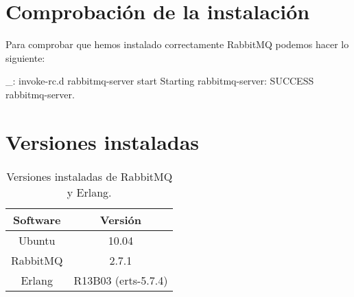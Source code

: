 \section{Comprobación de la instalación}

Para comprobar que hemos instalado correctamente RabbitMQ podemos hacer lo siguiente:

\begin{bashcode}
_: invoke-rc.d rabbitmq-server start
Starting rabbitmq-server: SUCCESS
rabbitmq-server.
\end{bashcode}


\section{Versiones instaladas}

\begin{table}[!htbp]
\centering
   \begin{tabular}{|c|c|}
      \hline
      \textbf{Software} & \textbf{Versión} \\ \hline
      Ubuntu & 10.04 \\ \hline
      RabbitMQ & 2.7.1 \\ \hline
      Erlang & R13B03 (erts-5.7.4) \\ \hline
   \end{tabular}
\caption{Versiones instaladas de RabbitMQ y Erlang.}
\label{table:rabbitmq-versions}
\end{table}
